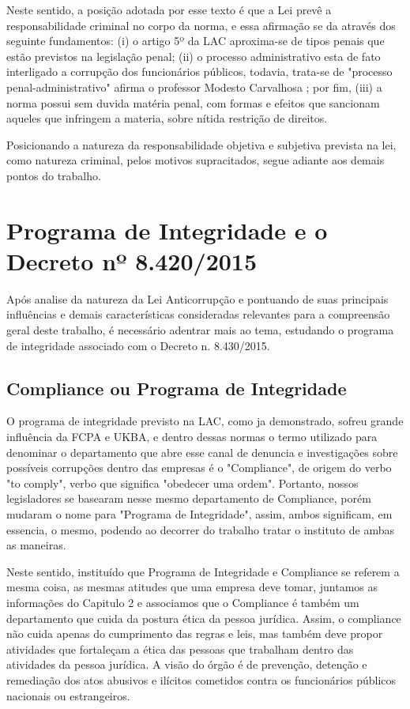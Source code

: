 Neste sentido, a posição adotada por esse texto é que a Lei prevê a responsabilidade criminal no corpo da norma, e essa afirmação se da através dos seguinte fundamentos: (i) o artigo 5º da LAC aproxima-se de tipos penais que estão previstos na legislação penal; (ii) o processo administrativo esta de fato interligado a corrupção dos funcionários públicos, todavia, trata-se de "processo penal-administrativo" afirma o professor Modesto Carvalhosa \cite{modestocarvalhosa}; por fim, (iii) a norma possui sem duvida matéria penal, com formas e efeitos que sancionam aqueles que infringem a materia, sobre nítida restrição de direitos. 

Posicionando a natureza da responsabilidade objetiva e subjetiva prevista na lei, como natureza criminal, pelos motivos supracitados, segue adiante aos demais pontos do trabalho. 

\chapter{Programa de Integridade e o Decreto nº 8.420/2015}

Após analise da natureza da Lei Anticorrupção e pontuando de suas principais influências e demais características consideradas relevantes para a compreensão geral deste trabalho, é necessário adentrar mais ao tema, estudando o programa de integridade associado com o Decreto n. 8.430/2015. 

\section{Compliance ou Programa de Integridade}

O programa de integridade previsto na LAC, como ja demonstrado, sofreu grande influência da FCPA e UKBA, e dentro dessas normas o termo utilizado para denominar o departamento que abre esse canal de denuncia e investigações sobre possíveis corrupções  dentro das empresas é o "Compliance", de origem do verbo "to comply", verbo que significa "obedecer uma ordem". Portanto, nossos legisladores se basearam nesse mesmo departamento de Compliance, porém mudaram o nome para "Programa de Integridade", assim, ambos significam, em essencia, o mesmo, podendo ao decorrer do trabalho tratar o instituto de ambas as maneiras. 

Neste sentido, instituído que Programa de Integridade e Compliance se referem a mesma coisa, as mesmas atitudes que uma empresa deve tomar, juntamos as informações do Capitulo 2 e associamos que o Compliance é também um departamento que cuida da postura ética da pessoa jurídica. Assim, o compliance não cuida apenas do cumprimento das regras e leis, mas também deve propor atividades que fortaleçam a ética das pessoas que trabalham dentro das atividades da pessoa jurídica. A visão do órgão é de prevenção, detenção e remediação dos atos abusivos e ilícitos cometidos contra os funcionários públicos nacionais ou estrangeiros. 

